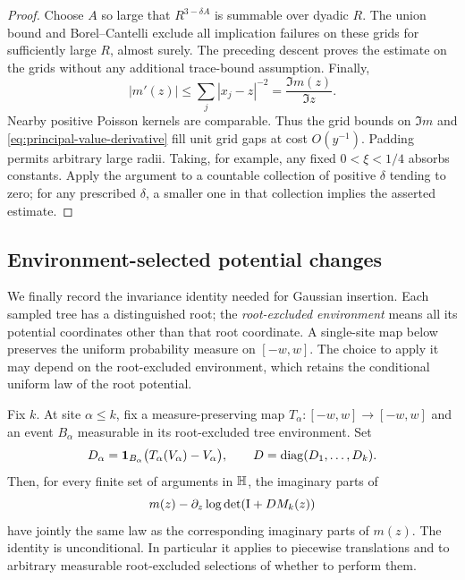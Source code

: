 \begin{proof}
Choose $A$ so large that $R^{3-\delta A}$ is summable over dyadic
$R$. The union bound and Borel--Cantelli exclude all implication
failures on these grids for sufficiently large $R$, almost surely.
The preceding descent proves the estimate on the grids without
any additional trace-bound assumption. Finally,
\begin{equation}\label{eq:principal-value-derivative}
 |m'(z)|\le\sum_j|x_j-z|^{-2}=\frac{\Im m(z)}{\Im z}.
\end{equation}
Nearby positive Poisson kernels are comparable. Thus the grid
bounds on $\Im m$ and \eqref{eq:principal-value-derivative} fill
unit grid gaps at cost $O(y^{-1})$. Padding permits arbitrary
large radii. Taking, for example, any fixed $0<\xi<1/4$ absorbs
constants. Apply the argument to a countable collection of positive
$\delta$ tending to zero; for any prescribed $\delta$, a smaller
one in that collection implies the asserted estimate.
\end{proof}

\subsection{Environment-selected potential changes}

We finally record the invariance identity needed for Gaussian
insertion. Each sampled tree has a distinguished root; the
\emph{root-excluded environment} means all its potential coordinates
other than that root coordinate. A single-site map below preserves
the uniform probability measure on $[-w,w]$. The choice to apply it
may depend on the root-excluded environment, which retains the
conditional uniform law of the root potential.

\begin{proposition}\label{prop:potential-switch}
Fix $k$. At site $\alpha\le k$, fix a measure-preserving map
$T_\alpha:[-w,w]\to[-w,w]$ and an event $B_\alpha$ measurable in
its root-excluded tree environment. Set
\[
 D_\alpha=\boldsymbol1_{B_\alpha}
                 \bigl(T_\alpha(V_\alpha)-V_\alpha\bigr),
             \qquad D=\operatorname{diag}(D_1,\ldots,D_k).
\]
Then, for every finite set of arguments in $\mathbb H$, the imaginary
parts of
\begin{equation}\label{eq:potential-switch-transform}
       m(z)-\partial_z\log\det(\mathrm I+D M_k(z))
\end{equation}
have jointly the same law as the corresponding imaginary parts
of $m(z)$. The identity is unconditional. In particular it applies
to piecewise translations and to arbitrary measurable
root-excluded selections of whether to perform them.
\end{proposition}

